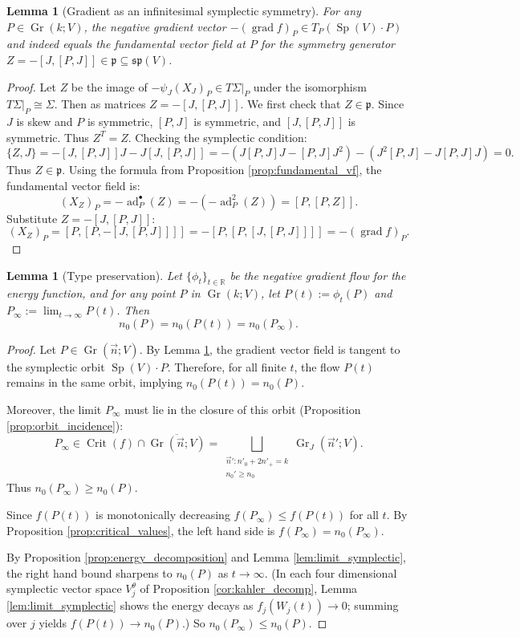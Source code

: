 \documentclass[12pt, final]{article}
\def\R{\mathbb{R}}
\def\Crit{\operatorname{Crit}}
\def\ad{\operatorname{ad}}
\def\grad{\operatorname{grad}}
\def\Sp{\operatorname{Sp}}
\def\Gr{\operatorname{Gr}}
\def\sp{\mathfrak{sp}}
\def\p{\mathfrak{p}}
\newtheorem{lemma}[theorem]{Lemma}
\begin{document}
\begin{lemma}[Gradient as an infinitesimal symplectic symmetry]
\label{lem:gradient_symmetry}
For any $P \in \Gr(k; V)$, the negative gradient vector $-(\grad f)_P \in T_P(\Sp(V)\cdot P)$ and indeed equals the fundamental vector field at $P$ for the symmetry generator $Z = -[J, [P, J]] \in \p \subseteq \sp(V)$.
\end{lemma}
\begin{proof}
Let $Z$ be the image of $-\psi_J(X_J)_P \in T\Sigma|_P$ under the isomorphism $T\Sigma|_P \cong \Sigma$. Then as matrices $Z = - [J, [P, J]]$.
We first check that $Z \in \p$.
Since $J$ is skew and $P$ is symmetric, $[P, J]$ is symmetric, and $[J, [P, J]]$ is symmetric. Thus $Z^T = Z$.
Checking the symplectic condition:
\[ \{Z, J\} = -[J, [P, J]]J - J[J, [P, J]] = - (J[P, J]J - [P, J]J^2) - (J^2[P, J] - J[P, J]J) = 0. \]
Thus $Z \in \p$.
Using the formula from Proposition \ref{prop:fundamental_vf}, the fundamental vector field is:
\[ (X_Z)_P = -\ad^\bullet_P(Z) = -(-\ad_P^2(Z)) = [P, [P, Z]]. \]
Substitute $Z = -[J, [P, J]]$:
\[ (X_Z)_P = [P, [P, -[J, [P, J]]]] = - [P, [P, [J, [P, J]]]] = -(\grad f)_P. \]
\end{proof}


\begin{lemma}[Type preservation]
\label{lem:type_preservation}
Let $\{\phi_t\}_{t \in \R}$ be the negative gradient flow for the energy function, and for any point $P$ in $\Gr(k; V)$, let $P(t):= \phi_t(P)$ and $P_\infty := \lim_{t \to \infty} P(t)$. Then
\[ n_0(P) = n_0 (P(t)) = n_0 (P_\infty).\]
\end{lemma}

\begin{proof}
Let $P \in \Gr(\vec{n}; V)$. By Lemma \ref{lem:gradient_symmetry}, the gradient vector field is tangent to the symplectic orbit $\Sp(V) \cdot P$. Therefore, for all finite $t$, the flow $P(t)$ remains in the same orbit, implying $n_0(P(t)) = n_0(P)$.

Moreover, the limit $P_\infty$ must lie in the closure of this orbit (Proposition \ref{prop:orbit_incidence}):
\[ P_\infty \in \Crit (f) \cap \overline{\Gr(\vec{n}; V)} = \bigsqcup_{\substack{\vec{n}': n'_0 + 2n'_+ = k\\ n_0' \ge n_0}} \Gr_J(\vec{n}'; V). \]
Thus $n_0(P_\infty) \ge n_0(P)$.

Since $f(P(t))$ is monotonically decreasing $f(P_\infty) \le f(P(t))$ for all $t$. By Proposition \ref{prop:critical_values}, the left hand side is $f(P_\infty) = n_0(P_\infty)$.

By Proposition \ref{prop:energy_decomposition} and Lemma \ref{lem:limit_symplectic}, the right hand bound sharpens to $n_0(P)$ as $t \to \infty$. (In each four dimensional symplectic vector space $V_j^\theta$ of Proposition \ref{cor:kahler_decomp}, Lemma \ref{lem:limit_symplectic} shows the energy decays as $f_j(W_j(t))  \to 0$; summing over $j$ yields $f(P(t)) \to n_0(P)$.) So $n_0(P_\infty) \le n_0(P)$.
\end{proof}
\end{document}
